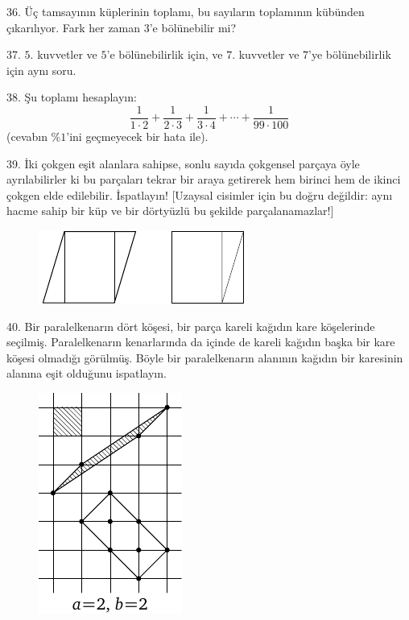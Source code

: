 \begin{problem}{36.}
	Üç tamsayının küplerinin toplamı, bu sayıların toplamının kü\-bün\-den çıkarılıyor. Fark her zaman $3$'e bölünebilir mi?
\end{problem}

\begin{problem}{37.}
	$5$. kuvvetler ve $5$'e bölünebilirlik için, ve $7$. kuvvetler ve $7$'ye bölünebilirlik için aynı soru.\end{problem}

\begin{problem}{38.}
Şu toplamı hesaplayın:
	\begin{equation*}
		\frac{1}{1\cdot 2} + \frac{1}{2\cdot 3} + \frac{1}{3\cdot 4} + \dotsb + \frac{1}{99\cdot 100}
	\end{equation*}
(cevabın $\%1$'ini geçmeyecek bir hata ile).
\end{problem}

\begin{problem}{39.}
	İki çokgen eşit alanlara sahipse, sonlu sayıda çokgensel parçaya öyle ayrılabilirler ki bu parçaları tekrar bir araya getirerek hem birinci hem de ikinci çokgen elde edilebilir. İspatlayın! 
[Uzaysal cisimler için bu doğru değildir: aynı hacme sahip bir küp ve bir dörtyüzlü bu şekilde parçalanamazlar!] 
	\begin{figure}
		\includegraphics{resources/q39_horizontal}
	\end{figure}
\end{problem}

\begin{problem}{40.}
	Bir paralelkenarın dört köşesi, bir parça kareli kağıdın kare kö\-şe\-le\-rin\-de seçilmiş. Paralelkenarın kenarlarında da içinde de kareli  kağıdın başka bir kare köşesi olmadığı görülmüş.
Böyle bir paralelkenarın ala\-nı\-nın kağıdın bir karesinin alanına eşit olduğunu ispatlayın.
	\begin{figure}
		\includegraphics{resources/taskbook-24}
	\end{figure}
\end{problem}

